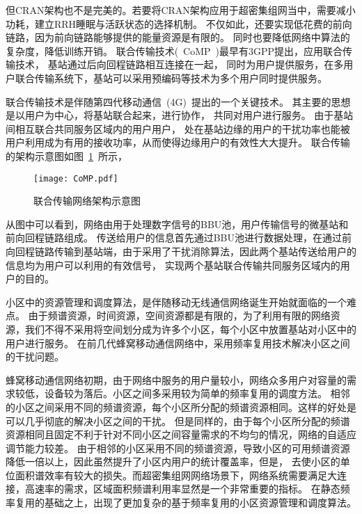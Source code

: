 但CRAN架构也不是完美的。若要将CRAN架构应用于超密集组网当中，需要减小功耗，建立RRH睡眠与活跃状态的选择机制。
不仅如此，还要实现低花费的前向链路，因为前向链路能够提供的能量资源是有限的。
同时也要降低网络中算法的复杂度，降低训练开销。
联合传输技术(~CoMP~)最早有3GPP提出，应用联合传输技术，
基站通过后向回程链路相互连接在一起，
同时为用户提供服务，在多用户联合传输系统下，基站可以采用预编码等技术为多个用户同时提供服务。

联合传输技术是伴随第四代移动通信~(4G)~提出的一个关键技术。
其主要的思想是以用户为中心，将基站联合起来，进行协作，
共同对用户进行服务。
由于基站间相互联合共同服务区域内的用户用户，
处在基站边缘的用户的干扰功率也能被用户利用成为有用的接收功率，从而使得边缘用户的有效性大大提升。
联合传输的架构示意图如图~\ref{CoMP}~所示，
\begin{figure}[htbp]
\centering
\texttt{[image: CoMP.pdf]}
\caption{联合传输网络架构示意图}\vspace{-0.5em}
\label{CoMP}
\end{figure}
从图中可以看到，网络由用于处理数字信号的BBU池，用户传输信号的微基站和前向回程链路组成。
传送给用户的信息首先通过BBU池进行数据处理，在通过前向回程链路传输到基站端，由于采用了干扰消除算法，因此两个基站传送给用户的信息均为用户可以利用的有效信号，
实现两个基站联合传输共同服务区域内的用户的目的。

小区中的资源管理和调度算法，是伴随移动无线通信网络诞生开始就面临的一个难点。
由于频谱资源，时间资源，空间资源都是有限的，为了利用有限的网络资源，我们不得不采用将空间划分成为许多个小区，每个小区中放置基站对小区中的用户进行服务。
在前几代蜂窝移动通信网络中，采用频率复用技术解决小区之间的干扰问题。

蜂窝移动通信网络初期，由于网络中服务的用户量较小，网络众多用户对容量的需求较低，设备较为落后。小区之间多采用较为简单的频率复用的调度方法。
相邻的小区之间采用不同的频谱资源，每个小区所分配的频谱资源相同。这样的好处是可以几乎彻底的解决小区之间的干扰。
但是同样的，由于每个小区所分配的频谱资源相同且固定不利于针对不同小区之间容量需求的不均匀的情况，网络的自适应调节能力较差。
由于相邻的小区采用不同的频谱资源，导致小区的可用频谱资源降低一倍以上，因此虽然提升了小区内用户的统计覆盖率，但是，
去使小区的单位面积谱效率有较大的损失。而超密集组网网络场景下，网络系统需要满足大连接，高速率的需求，区域面积频谱利用率显然是一个非常重要的指标。
在静态频率复用的基础之上，出现了更加复杂的基于频率复用的小区资源管理和调度算法。

